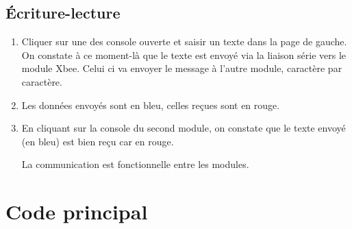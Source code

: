\subsection{Écriture-lecture}

\begin{enumerate}
    
    \item Cliquer sur une des console ouverte et saisir un texte dans la page de gauche.\\
    On constate à ce moment-là que le texte est envoyé via la liaison série vers le module Xbee. Celui ci va envoyer le message à l'autre module, caractère par caractère.


\item  Les données envoyés sont en bleu, celles reçues sont en rouge.

\item En cliquant sur la console du second module, on constate que le texte envoyé (en bleu) est bien reçu car en rouge.


La communication est fonctionnelle entre les modules.
\end{enumerate}


\label{code}
\section{Code principal}

